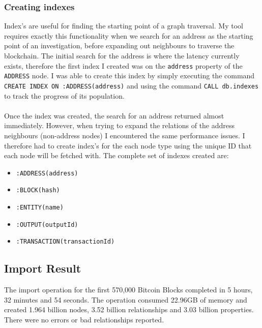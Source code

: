 \subsubsection{Creating indexes}
Index's are useful for finding the starting point of a graph traversal. My tool requires exactly this functionality when we search for an address as the starting point of an investigation, before expanding out neighbours to traverse the blockchain. The initial search for the address is where the latency currently exists, therefore the first index I created was on the \texttt{address} property of the \texttt{ADDRESS} node. I was able to create this index by simply executing the command \texttt{CREATE INDEX ON :ADDRESS(address)} and using the command \texttt{CALL db.indexes} to track the progress of its population. 
\\\\
Once the index was created, the search for an address returned almost immediately. However, when trying to expand the relations of the address neighbours (non-address nodes) I encountered the same performance issues. I therefore had to create index's for the each node type using the unique ID that each node will be fetched with. The complete set of indexes created are:
\begin{itemize}
    \item \texttt{:ADDRESS(address)}
    \item \texttt{:BLOCK(hash)}
    \item \texttt{:ENTITY(name)}
    \item \texttt{:OUTPUT(outputId)}
    \item \texttt{:TRANSACTION(transactionId)}
\end{itemize}

\subsection{Import Result}
The import operation for the first 570,000 Bitcoin Blocks completed in 5 hours, 32 minutes and 54 seconds. The operation consumed 22.96GB of memory and created 1.964 billion nodes, 3.52 billion relationships and 3.03 billion properties. There were no errors or bad relationships reported. 